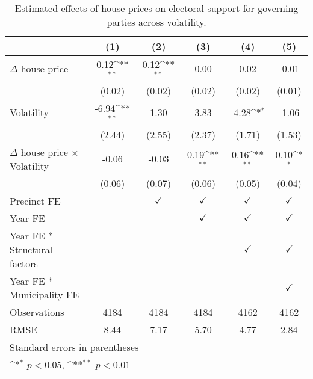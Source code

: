 \begin{table}[htbp]\centering
\def\sym#1{\ifmmode^{#1}\else\(^{#1}\)\fi}
\caption{Estimated effects of house prices on electoral support for governing parties across volatility.} \label{tab5}
\begin{tabular}{l*{5}{c}}
\hline\hline
                    &\multicolumn{1}{c}{(1)}        &\multicolumn{1}{c}{(2)}        &\multicolumn{1}{c}{(3)}        &\multicolumn{1}{c}{(4)}        &\multicolumn{1}{c}{(5)}        \\
\hline
$\Delta$ house price&        0.12\sym{**}&        0.12\sym{**}&        0.00        &        0.02        &       -0.01        \\
                    &      (0.02)        &      (0.02)        &      (0.02)        &      (0.02)        &      (0.01)        \\
[1em]
Volatility          &       -6.94\sym{**}&        1.30        &        3.83        &       -4.28\sym{*} &       -1.06        \\
                    &      (2.44)        &      (2.55)        &      (2.37)        &      (1.71)        &      (1.53)        \\
[1em]
$\Delta$ house price $\times$ Volatility&       -0.06        &       -0.03        &        0.19\sym{**}&        0.16\sym{**}&        0.10\sym{*} \\
                    &      (0.06)        &      (0.07)        &      (0.06)        &      (0.05)        &      (0.04)        \\
[1em]
\hline Precinct FE  &                    &$\checkmark$        &$\checkmark$        &$\checkmark$        &$\checkmark$        \\
[1em]
Year FE             &                    &                    &$\checkmark$        &$\checkmark$        &$\checkmark$        \\
[1em]
Year FE * Structural factors&                    &                    &                    &$\checkmark$        &$\checkmark$        \\
[1em]
Year FE * Municipality FE&                    &                    &                    &                    &$\checkmark$        \\
\hline
Observations        &        4184        &        4184        &        4184        &        4162        &        4162        \\
RMSE                &        8.44        &        7.17        &        5.70        &        4.77        &        2.84        \\
\hline\hline
\multicolumn{6}{l}{\footnotesize Standard errors in parentheses}\\
\multicolumn{6}{l}{\footnotesize \sym{*} \(p<0.05\), \sym{**} \(p<0.01\)}\\
\end{tabular}
\end{table}
